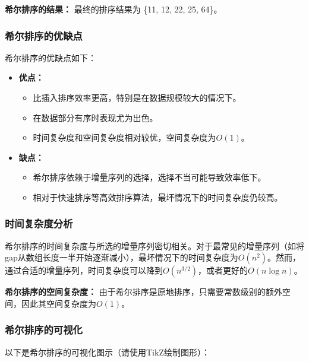 \documentclass{article}
\begin{document}
\noindent
\textbf{希尔排序的结果：}
最终的排序结果为 \{11, 12, 22, 25, 64\}。

\subsubsection{希尔排序的优缺点}
希尔排序的优缺点如下：

\begin{itemize}
    \item \textbf{优点：}
    \begin{itemize}
        \item 比插入排序效率更高，特别是在数据规模较大的情况下。
        \item 在数据部分有序时表现尤为出色。
        \item 时间复杂度和空间复杂度相对较优，空间复杂度为$O(1)$。
    \end{itemize}
    \item \textbf{缺点：}
    \begin{itemize}
        \item 希尔排序依赖于增量序列的选择，选择不当可能导致效率低下。
        \item 相对于快速排序等高效排序算法，最坏情况下的时间复杂度仍较高。
    \end{itemize}
\end{itemize}

\subsubsection{时间复杂度分析}
希尔排序的时间复杂度与所选的增量序列密切相关。对于最常见的增量序列（如将gap从数组长度一半开始逐渐减小），最坏情况下的时间复杂度为$O(n^2)$。然而，通过合适的增量序列，时间复杂度可以降到$O(n^{3/2})$，或者更好的$O(n \log n)$。

\noindent
\textbf{希尔排序的空间复杂度：}
由于希尔排序是原地排序，只需要常数级别的额外空间，因此其空间复杂度为$O(1)$。

\subsubsection{希尔排序的可视化}
以下是希尔排序的可视化图示（请使用TikZ绘制图形）：

\end{document}
